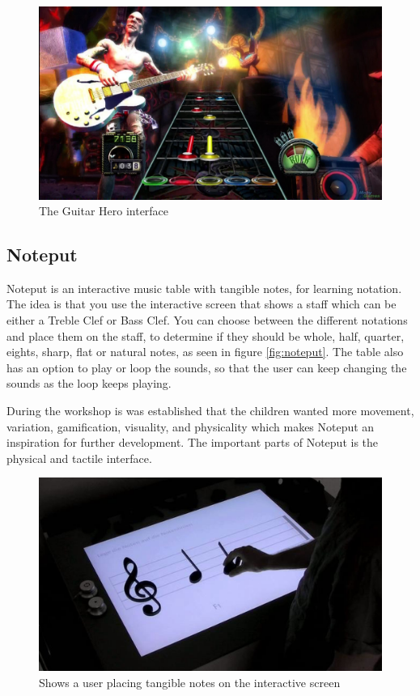 \begin{figure}[H]
	\centering
	\includegraphics[width=0.7\linewidth]{figure/Analysis/guitarhero}
	\caption{The Guitar Hero interface}
	\label{fig:guitarHero}
\end{figure}

\subsection{Noteput} 
Noteput is an interactive music table with tangible notes, for learning notation. The idea is that you use the interactive screen that shows a staff which can be either a Treble Clef or Bass Clef. You can choose between the different notations and place them on the staff, to determine if they should be whole, half, quarter, eights, sharp, flat or natural notes, as seen in figure \autoref{fig:noteput}. The table also has an option to play or loop the sounds, so that the user can keep changing the sounds as the loop keeps playing. 

During the workshop is was established that the children wanted more movement, variation, gamification, visuality, and physicality which makes Noteput an inspiration for further development. The important parts of Noteput is the physical and tactile interface.

\begin{figure}[H]
	\centering
	\includegraphics[width=0.7\linewidth]{figure/Analysis/noteput}
	\caption{Shows a user placing tangible notes on the interactive screen}
	\label{fig:noteput}
\end{figure}

